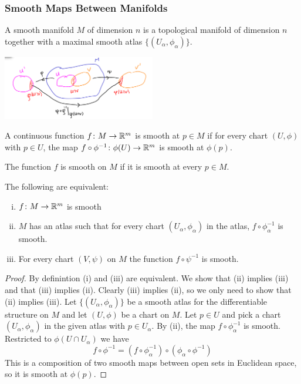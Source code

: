 \begin{frame}
  \frametitle{Smooth Maps Between Manifolds}
  \begin{defn}
    A smooth manifold $M$ of dimension $n$ is a 
    topological manifold of dimension $n$
    together with a maximal smooth atlas 
    $\{(U_\alpha, \phi_\alpha)\}$.
  \end{defn}
  \begin{center}
    \includegraphics[width=0.5\textwidth]{figures/two_charts.png}
  \end{center}
  \begin{defn}
    A continuous function $f \colon M \to \mathbb R^m$ is
    smooth at $p \in M$ if for every chart $(U, \phi)$
    with $p \in U$, the map
    $f \circ \phi^{-1} \colon \phi(U) \to \mathbb R^m$
    is smooth at $\phi(p)$.

    The function $f$ is smooth on $M$ if it is smooth at every 
    $p \in M$.
  \end{defn}
\end{frame}
\begin{frame}
  \begin{prop}
    The following are equivalent:
    \begin{enumerate}[(i)]
      \item $f \colon M \to \mathbb R^m$ is smooth
      \item $M$ has an atlas such that
        for every chart $(U_\alpha, \phi_\alpha)$ in the atlas,
        $f \circ \phi_\alpha^{-1}$ is smooth.
      \item For every chart $(V, \psi)$ on $M$ the 
        function $f \circ \psi^{-1}$ is smooth.
    \end{enumerate}
  \end{prop}
  \begin{proof}
    By definintion (i) and (iii) are equivalent.
    We show that (ii) implies (iii) and that (iii) implies (ii).
    Clearly (iii) implies (ii), so we only need to show
    that (ii) implies (iii).
    Let $\{(U_\alpha, \phi_\alpha)\}$ be a smooth atlas for the
    differentiable structure on $M$ and let $(U, \phi)$ be a 
    chart on $M$. Let $p \in U$ and pick a chart $(U_\alpha, \phi_\alpha)$
    in the given atlas
    with $p \in U_\alpha$. 
    By (ii), the map $f \circ \phi_\alpha^{-1}$ is smooth. Restricted to
    $\phi(U \cap U_\alpha)$ we have
    \begin{displaymath}
      f \circ \phi^{-1} = (f \circ \phi_\alpha^{-1}) \circ
      (\phi_\alpha \circ \phi^{-1})
    \end{displaymath}
    This is a composition of two smooth maps between open 
    sets in Euclidean space, so it is smooth at $\phi(p)$.
  \end{proof}
\end{frame}
